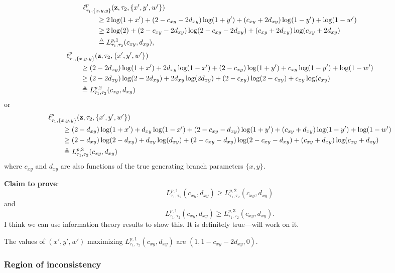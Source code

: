 \documentclass[a4paper]{article}
\begin{document}
\begin{align*}
    & \ell^p_{\tau_1,\{x,y,y\}}(\mathbf{z},\tau_2,\{x',y',w'\}) \\
    &\qquad \ge 2\log(1+x')+(2-c_{xy}-2d_{xy})\log(1+y')+(c_{xy}+2d_{xy})\log(1-y')+\log(1-w') \\
    &\qquad \ge 2\log(2)+(2-c_{xy}-2d_{xy})\log(2-c_{xy}-2d_{xy})+(c_{xy}+2d_{xy})\log(c_{xy}+2d_{xy}) \\
    &\qquad \triangleq L^{p,1}_{\tau_1,\tau_2}(c_{xy}, d_{xy}),
\end{align*}
\begin{align*}
    & \ell^p_{\tau_1,\{x,y,y\}}(\mathbf{z},\tau_2,\{x',y',w'\}) \\
    &\qquad \ge (2-2d_{xy})\log(1+x')+2d_{xy}\log(1-x') + (2-c_{xy})\log(1+y')+c_{xy}\log(1-y')+\log(1-w') \\
    &\qquad \ge (2-2d_{xy})\log(2-2d_{xy})+2d_{xy}\log(2d_{xy}) + (2-c_{xy})\log(2-c_{xy})+c_{xy}\log(c_{xy}) \\
    &\qquad \triangleq L^{p,2}_{\tau_1,\tau_2}(c_{xy}, d_{xy})
\end{align*}
or
\begin{align*}
    & \ell^p_{\tau_1,\{x,y,y\}}(\mathbf{z},\tau_2,\{x',y',w'\}) \\
    &\qquad \ge (2-d_{xy})\log(1+x')+d_{xy}\log(1-x') + (2-c_{xy}-d_{xy})\log(1+y')+(c_{xy}+d_{xy})\log(1-y')+\log(1-w') \\
    &\qquad \ge (2-d_{xy})\log(2-d_{xy})+d_{xy}\log(d_{xy}) + (2-c_{xy}-d_{xy})\log(2-c_{xy}-d_{xy})+(c_{xy}+d_{xy})\log(c_{xy}+d_{xy}) \\
    &\qquad \triangleq L^{p,3}_{\tau_1,\tau_2}(c_{xy}, d_{xy})
\end{align*}
where $c_{xy}$ and $d_{xy}$ are also functions of the true generating branch parameters $\{x,y\}$.

\textbf{Claim to prove}:
$$
L^{p,1}_{\tau_1,\tau_2}(c_{xy}, d_{xy}) \ge L^{p,2}_{\tau_1,\tau_2}(c_{xy}, d_{xy})
$$
and
$$
L^{p,1}_{\tau_1,\tau_2}(c_{xy}, d_{xy}) \ge L^{p,3}_{\tau_1,\tau_2}(c_{xy}, d_{xy}).
$$
I think we can use information theory results to show this.
It is definitely true---will work on it.

The values of $(x', y', w')$ maximizing $L^{p,1}_{\tau_1,\tau_2}(c_{xy}, d_{xy})$ are $(1, 1-c_{xy}-2d_{xy},0)$.

\subsubsection{Region of inconsistency}
\end{document}
